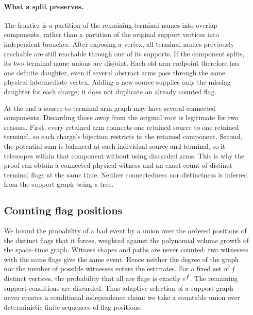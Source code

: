 \paragraph{What a split preserves.}
The frontier is a partition of the remaining terminal names into overlap components, rather than a partition of the original support vertices into independent branches. After exposing a vertex, all terminal names previously reachable are still reachable through one of its supports. If the component splits, its two terminal-name unions are disjoint. Each old arm endpoint therefore has one definite daughter, even if several abstract arms pass through the same physical intermediate vertex. Adding a new source supplies only the missing daughter for each charge; it does not duplicate an already counted flag.

At the end a source-to-terminal arm graph may have several connected components. Discarding those away from the original root is legitimate for two reasons. First, every retained arm connects one retained source to one retained terminal, so each charge's bijection restricts to the retained component. Second, the potential sum is balanced at each individual source and terminal, so it telescopes within that component without using discarded arms. This is why the proof can obtain a connected physical witness and an exact count of distinct terminal flags at the same time. Neither connectedness nor distinctness is inferred from the support graph being a tree.
\subsection{Counting flag positions}

\theoremstyle{plain}
\newtheorem{letteredlemmainner}{Lemma}
\newenvironment{letteredlemma}[1]
 {\renewcommand{\theletteredlemmainner}{#1}\def\theHletteredlemmainner{#1}%
  \addtocounter{letteredlemmainner}{-1}\begin{letteredlemmainner}}
 {\end{letteredlemmainner}}
\theoremstyle{remark}
We bound the probability of a bad event by a union over the ordered positions of the distinct
flags that it forces, weighted against the polynomial volume growth of the space--time graph.
Witness shapes and paths are never counted: two witnesses with the same flags give the same event.
Hence neither the degree of the graph nor the number of possible witnesses enters the estimates.
For a fixed set of $f$ distinct vertices, the probability that all are flags is exactly
$\varepsilon^f$. The remaining support conditions are discarded. Thus adaptive selection of a
support graph never creates a conditional independence claim: we take a countable union over
deterministic finite sequences of flag positions.

